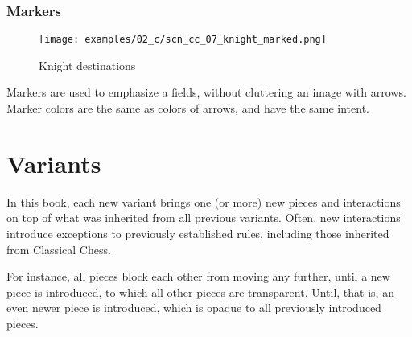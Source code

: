 \clearpage %

\subsubsection*{Markers}
\label{sec:Classical Chess/Chessboard/Examples/Markers}

\vspace*{-0.7\baselineskip}
\noindent
\begin{wrapfigure}[6]{l}{0.4\textwidth}
\centering
\texttt{[image: examples/02\_c/scn\_cc\_07\_knight\_marked.png]}
\vspace*{-1.4\baselineskip}
\caption{Knight destinations}
\label{fig:scn_cc_07_knight_marked}
\end{wrapfigure}
Markers are used to emphasize a fields, without cluttering an image with arrows. \newline
\indent
Marker colors are the same as colors of arrows, and have the same intent.



\vspace*{3.7\baselineskip}
\section*{Variants}
\label{sec:Classical Chess/Variants}

In this book, each new variant brings one (or more) new pieces and interactions
on top of what was inherited from all previous variants. Often, new interactions
introduce exceptions to previously established rules, including those inherited
from Classical Chess.

For instance, all pieces block each other from moving any further, until a new
piece is introduced, to which all other pieces are transparent. Until, that is,
an even newer piece is introduced, which is opaque to all previously introduced
pieces.

